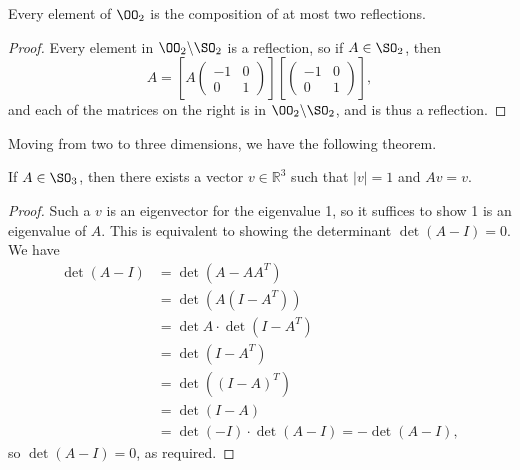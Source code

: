 \documentclass[a4paper]{scrartcl}
\begin{document}
\begin{corollary}
	Every element of $\OO_2$ is the composition of at most two reflections.
\end{corollary}
\begin{proof}
	Every element in $\OO_2 \backslash \SO_2$ is a reflection, so if $A \in \SO_2$, then
	$$
	A =\left[ A \begin{pmatrix}
		-1 & 0 \\ 0 & 1
	\end{pmatrix}\right]\left[\begin{pmatrix}
		-1 & 0 \\ 0 & 1
	\end{pmatrix}\right],
	$$
	and each of the matrices on the right is in $\OO_2 \backslash \SO_2$, and is thus a reflection.
\end{proof}

Moving from two to three dimensions, we have the following theorem.
\begin{theorem}
	If $A \in \SO_3$, then there exists a vector $v \in \mathbb{R}^3$ such that $|v| = 1$ and $Av = v$.
\end{theorem}
\begin{proof}
	Such a $v$ is an eigenvector for the eigenvalue 1, so it suffices to show 1 is an eigenvalue of $A$. This is equivalent to showing the determinant $\det(A - I) = 0$. We have
	{\allowdisplaybreaks
	\begin{align*}
\det(A - I) &= \det(A - AA^T) \\
			&= \det(A(I - A^T)) \\
			&= \det A \cdot \det (I - A^T) \\
			&= \det(I - A^T)\\
			&= \det((I - A)^T)\\
			&= \det(I - A) \\
			&= \det(-I) \cdot \det(A - I) = -\det(A - I),
	\end{align*}}
	so $\det(A - I) = 0$, as required.
\end{proof}
\end{document}
